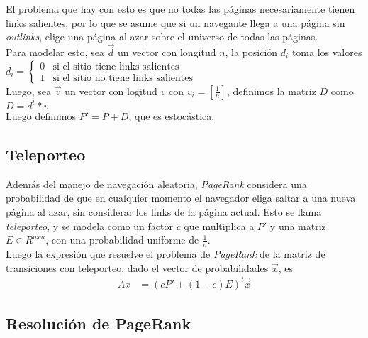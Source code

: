 El problema que hay con esto es que no todas las páginas necesariamente tienen links
salientes, por lo que se asume que si un navegante llega a una página sin \textit{outlinks},
elige una página al azar sobre el universo de todas las páginas.\\

Para modelar esto, sea $\vec{d}$ un vector con longitud $n$, la posición $d_i$ toma los valores\\

\begin{math}
d_i =
\left\{
\begin{array}{ll}
0   & \mbox{si el sitio tiene links salientes}\\
1   & \mbox{si el sitio no tiene links salientes}
\end{array}
\right.
\end{math}\\

Luego, sea $\vec{v}$ un vector con logitud $v$ con $v_i = [\frac{1}{n}]$, definimos
la matriz $D$ como\\

\begin{math}
D = d^t * v
\end{math}\\

Luego definimos $P' = P + D$, que es estocástica.

\subsection{Teleporteo}

Además del manejo de navegación aleatoria, \textit{PageRank} considera una probabilidad de que
en cualquier momento el navegador eliga saltar a una nueva página al azar, sin considerar
los links de la página actual. Esto se llama \textit{teleporteo}, y se modela como un factor
$c$ que multiplica a $P'$  y una matriz $E \in R^{nxn}$, con una probabilidad uniforme de $\frac{1}{n}$.\\

Luego la expresión que resuelve el problema de \textit{PageRank} de la matriz de transiciones
con teleporteo, dado el vector de probabilidades $\vec{x}$, es\\

\begin{align*}
Ax & =(cP' + (1-c)E)^{t} \vec{x}
\end{align*}

\subsection{Resolución de PageRank}

